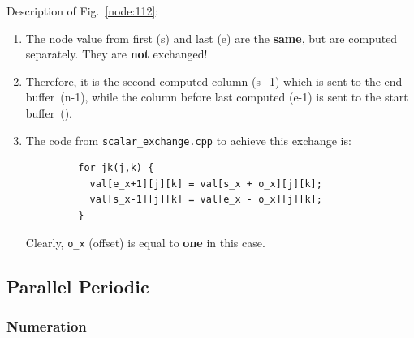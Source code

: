 Description of Fig.~\ref{node:112}:
\begin{enumerate}
  \item The node value from first ({\sf s}) and last ({\sf e}) are the 
        {\bf same}, but are computed separately. They are {\bf not} exchanged!
  \item Therefore, it is the second computed column ({\sf s+1}) which is sent 
        to the end buffer~({\sf n-1}), while the column before last computed 
        ({\sf e-1}) is sent to the start buffer~({}).
  \item The code from {\tt scalar\_exchange.cpp} to achieve this exchange is:
        \begin{verbatim}
         for_jk(j,k) {
           val[e_x+1][j][k] = val[s_x + o_x][j][k];
           val[s_x-1][j][k] = val[e_x - o_x][j][k];
         }
        \end{verbatim}
        Clearly, {\tt o\_x} (offset) is equal to {\bf one} in this case.
\end{enumerate}

\clearpage
\subsection{Parallel Periodic}

\subsubsection{Numeration}

